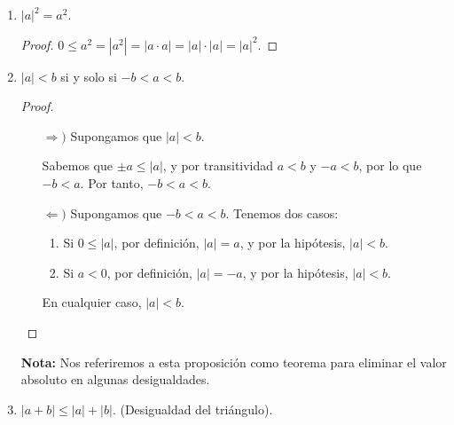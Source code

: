 \documentclass[11pt]{article}
\begin{document}
\begin{enumerate}[label=\alph*)]
\item $|a|^2=a^2$.
\vspace{-1em}\begin{proof} 
    $0 \leq a^2 = |a^2|= |a\cdot a|=|a| \cdot |a|= |a|^2$. \qedhere
\end{proof} \vspace{-1em}

\item $|a|<b$ si y solo si $-b<a<b$.

\vspace{-1em}\begin{proof} \leavevmode
    \begin{itemize}
        \item[$\Rightarrow)$] Supongamos que $|a|<b$.
        
        Sabemos que $\pm a \leq |a|$, y por transitividad $a<b$ y $-a<b$, por lo que $-b<a$. Por tanto, $-b<a<b$.
        \item[$\Leftarrow)$] Supongamos que $-b<a<b$. Tenemos dos casos: \begin{enumerate}[label=\roman*)]
            \item Si $0\leq |a|$, por definición, $|a|=a$, y por la hipótesis, $|a|<b$.
            \item Si $a<0$, por definición, $|a|=-a$, y por la hipótesis, $|a|<b$.
        \end{enumerate} En cualquier caso, $|a|<b$. \qedhere 
    \end{itemize}
\end{proof} \vspace{-1em}

\textbf{Nota:} Nos referiremos a esta proposición como teorema para eliminar el valor absoluto en algunas desigualdades.

\pagebreak

    \item $|a+b|\leq |a|+|b|$. (Desigualdad del triángulo).


\end{enumerate}
\end{document}
